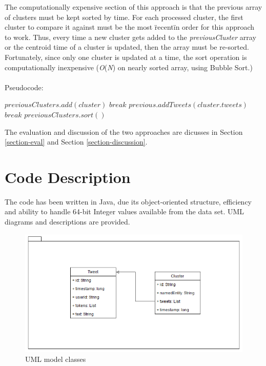 \documentclass[a4paper,portrait,12pt]{article}
\begin{document}
\begin{enumerate}
		  The computationally expensive section of this approach is that the previous array of clusters must be kept sorted by time.
		  For each processed cluster, the first cluster to compare it against must be the most \"recent\" in order for this approach to work. 
		  Thus, every time a new cluster gets added to the \textit{previousCluster} array or the centroid time of a cluster is updated, then the array must be re-sorted.\\
		  Fortunately, since only one cluster is updated at a time, the sort operation is computationally inexpensive (\textit{O}(\textit{N}) on nearly sorted array, using Bubble Sort.) 
	      \\\\
	      Pseudocode:
	      \begin{algorithmic}
						\State $previousClusters.add(cluster)$
						\State $break$
					\EndIf
						\State $previous.addTweets(cluster.tweets)$
						\State $break$
					\EndIf
				\EndFor
				\State $previousClusters.sort()$
		      \EndFor
	      \end{algorithmic}
\end{enumerate}

The evaluation and discussion of the two approaches are dicusses in Section \ref{section-eval} and Section \ref{section-discussion}.

\section{Code Description}
The code has been written in Java, due its object-oriented structure, efficiency and ability to handle 64-bit Integer values available from the data set.
UML diagrams and descriptions are provided.\\

\begin{figure}[h!]
	\centering
	\includegraphics[width=0.5\linewidth]{images/modelUML.png}
	\caption{UML model classes}
	\label{fig:modelUML}
\end{figure}
\end{document}
